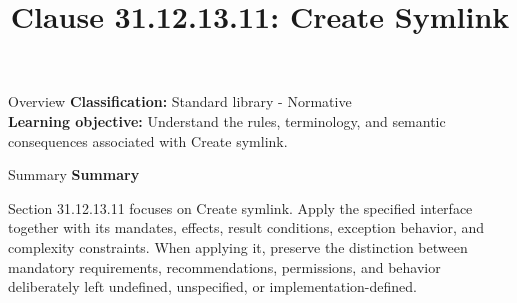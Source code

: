 \documentclass[10pt,letterpaper]{article}
\title{Clause 31.12.13.11: Create Symlink}
\author{}
\date{}
\begin{document}
\maketitle
\begin{CornellOverviewBox}{Overview}
\textbf{Classification:} Standard library - Normative\\[2pt]
\textbf{Learning objective:} Understand the rules, terminology, and semantic consequences associated with Create symlink.
\end{CornellOverviewBox}\begin{CornellSummaryBox}{Summary}
{\sffamily\bfseries\color{Accent} Summary}\par\vspace{3pt}Section 31.12.13.11 focuses on Create symlink. Apply the specified interface together with its mandates, effects, result conditions, exception behavior, and complexity constraints. When applying it, preserve the distinction between mandatory requirements, recommendations, permissions, and behavior deliberately left undefined, unspecified, or implementation-defined.
\end{CornellSummaryBox}
\end{document}
